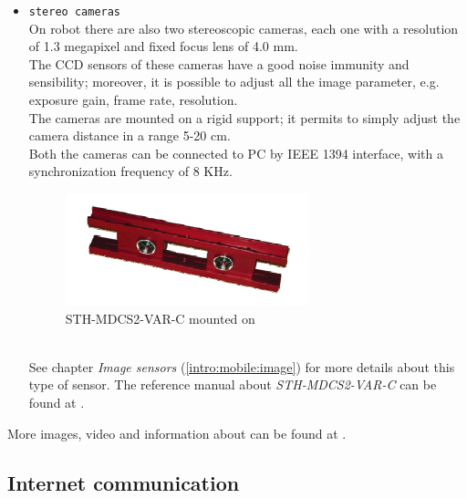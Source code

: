 \begin{itemize}
\item \texttt{stereo cameras} \\
  On robot there are also two stereoscopic cameras, each one with a
  resolution of 1.3 megapixel and fixed focus lens of 4.0 mm. \\
  The CCD sensors of these cameras have a good noise immunity and
  sensibility; moreover, it is possible to adjust all the image parameter, e.g.
  exposure gain, frame rate, resolution. \\
  The cameras are mounted on a rigid support; it permits to simply adjust
  the camera distance in a range 5-20 cm. \\
  Both the cameras can be connected to PC by IEEE 1394 interface, with a
  synchronization frequency of 8 KHz. \\
  \begin{figure}[h]
    \begin{center}
      \includegraphics[width=200pt]{img/camera_videre.png}
      \caption{STH-MDCS2-VAR-C mounted on \morduc{}}
      \label{fig:camera_videre}
    \end{center}
  \end{figure}
  \\
  See chapter \textit{Image sensors} (\ref{intro:mobile:image}) for more details
  about this type of sensor. The reference manual about \textit{STH-MDCS2-VAR-C}
  can be found at \cite{3morduc:camera_sth_mdcs2}.

\end{itemize}

More images, video and information about \morduc{} can
be found at \cite{morduc:features}.


\subsection{Internet communication}
\label{intro:3morduc:communication}

